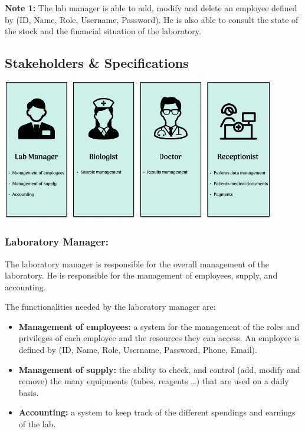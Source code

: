 \documentclass{article}
\begin{document}

\textbf{Note 1:} The lab manager is able to add, modify and delete an employee defined by (ID, Name, Role, Username, Password).
He is also able to consult the state of the stock and the financial situation of the laboratory.



\subsection[Stakeholders \& Specifications]{Stakeholders \& Specifications}

\begin{center}
    \includegraphics[width=451px]{media/stakeholders.png}
\end{center}

\subsubsection*{Laboratory Manager:}

The laboratory manager is responsible for the overall management of the laboratory. He is responsible for the management of employees, supply, and accounting.

\noindent The functionalities needed by the laboratory manager are:

\begin{itemize}

\item \textbf{Management of employees:} a system for the management of the roles and privileges of each employee and the resources they can access. An employee is defined by (ID, Name, Role, Username, Password, Phone, Email).

\item \textbf{Management of supply:} the ability to check, and control (add, modify and remove) the many equipments (tubes, reagents \ldots) that are used on a daily basis.

\item \textbf{Accounting:} a system to keep track of the different spendings and earnings of the lab.

\end{itemize}
\end{document}
